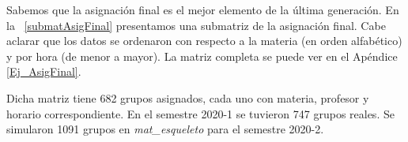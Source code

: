 %

Sabemos que la asignación final es el mejor elemento de la última generación. En la \tablename{~\ref{submatAsigFinal}} presentamos una submatriz de la asignación final. Cabe aclarar que los datos se ordenaron con respecto a la materia (en orden alfabético) y por hora (de menor a mayor). La matriz completa se puede ver en el Apéndice \ref{Ej_AsigFinal}.

Dicha matriz tiene 682 grupos asignados, cada uno con materia, profesor y horario correspondiente. En el semestre 2020-1 se tuvieron 747 grupos reales. Se simularon 1091 grupos en \textit{mat\_esqueleto} para el semestre 2020-2.

